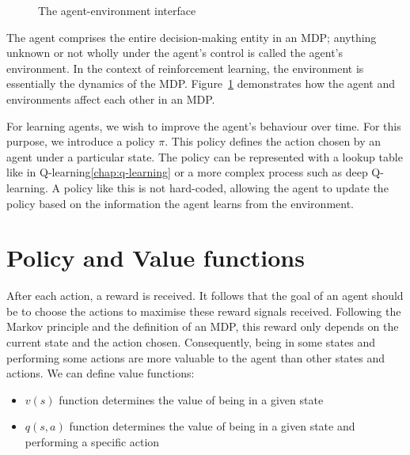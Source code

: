 \documentclass[]{final_report}
\begin{document}
\begin{figure}[H]
  \centering
  \fboxsep 2mm
  \caption{\label{fig:agent-enviroment} The agent-environment interface}
\end{figure}


The agent comprises the entire decision-making entity in an MDP; anything unknown or not wholly under the agent's control is called the agent's environment. In the context of reinforcement learning, the environment is essentially the dynamics of the MDP. Figure~\ref{fig:agent-enviroment} demonstrates how the agent and environments affect each other in an MDP. 

\label{policy-informal-definition}
For learning agents, we wish to improve the agent's behaviour over time. For this purpose, we introduce a policy $\pi$. This policy defines the action chosen by an agent under a particular state. The policy can be represented with a lookup table like in Q-learning\ref{chap:q-learning} or a more complex process such as deep Q-learning. A policy like this is not hard-coded, allowing the agent to update the policy based on the information the agent learns from the environment. 


\section{Policy and Value functions}

After each action, a reward is received. It follows that the goal of an agent should be to choose the actions to maximise these reward signals received. Following the Markov principle and the definition of an MDP, this reward only depends on the current state and the action chosen. Consequently, being in some states and performing some actions are more valuable to the agent than other states and actions. We can define value functions: 
\begin{itemize}
  \item $v(s)$ function determines the value of being in a given state
  \item $q(s,a)$ function determines the value of being in a given state and performing a specific action
\end{itemize}
\end{document}
